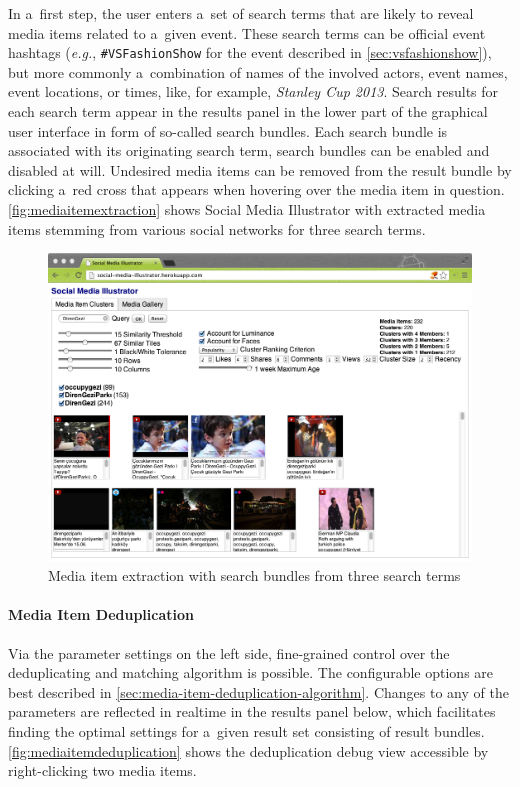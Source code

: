 In a~first step, the user enters a~set of search terms
that are likely to reveal media items related to a~given event.
These search terms can be official event hashtags
(\emph{e.g.}, \texttt{\#VSFashionShow}
for the event described in \autoref{sec:vsfashionshow}),
but more commonly a~combination of names of the involved actors,
event names, event locations, or times, like, for example, \emph{Stanley Cup 2013}.
Search results for each search term appear in the results panel
in the lower part of the graphical user interface
in form of so-called search bundles.
Each search bundle is associated with its originating search term,
search bundles can be enabled and disabled at will.
Undesired media items can be removed from the result bundle
by clicking a~red cross that appears
when hovering over the media item in question.
\autoref{fig:mediaitemextraction} shows Social Media Illustrator
with extracted media items stemming from various social networks
for three search terms.

\begin{figure}[!ht]
  \centering
  \includegraphics[width=1\columnwidth]{app1.png}
  \caption{Media item extraction with search bundles from three search terms}
  \label{fig:mediaitemextraction}
\end{figure}

\paragraph{Media Item Deduplication}

Via the parameter settings on the left side, 
fine-grained control over the deduplicating
and matching algorithm is possible. 
The configurable options are best described in \autoref{sec:media-item-deduplication-algorithm}.
Changes to any of the parameters are reflected in realtime
in the results panel below, which facilitates finding the optimal 
settings for a~given result set consisting of result bundles.
\autoref{fig:mediaitemdeduplication} shows the deduplication debug view
accessible by right-clicking two media items.

